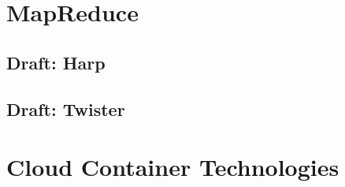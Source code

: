 \documentclass{format/laszewski}
\begin{document}
\maketitle



\part{MapReduce}
\label{p:mapreduce}






%

\chapter{Draft: Harp}
\label{c:harp}



\chapter{Draft: Twister}
\label{c:twister}



\part{Cloud Container Technologies}










%







\end{document}
